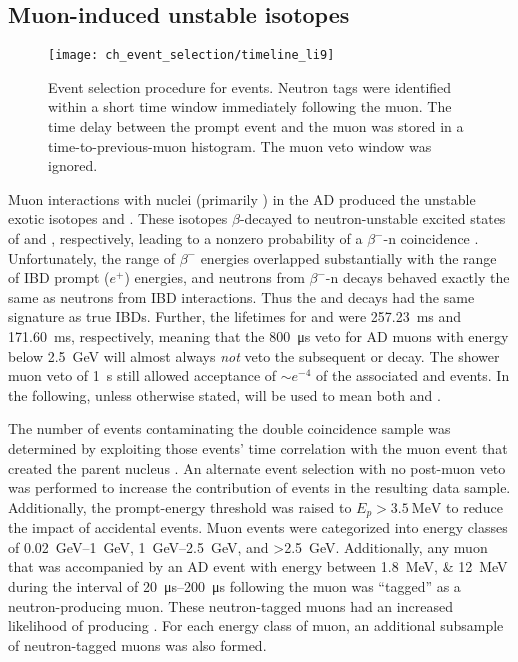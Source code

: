 \subsection{Muon-induced unstable isotopes}
\label{subsec:li9}

\begin{figure}
    \centering
    \texttt{[image: ch\_event\_selection/timeline\_li9]}
    \caption[\li{}/\he{} event selection]{
        Event selection procedure for \li{} events.
        Neutron tags were identified within a short time window
        immediately following the muon.
        The time delay between the prompt event and the muon
        was stored in a time-to-previous-muon histogram.
        The muon veto window was ignored.
    }
    \label{fig:li9_timeline}
\end{figure}

Muon interactions with nuclei (primarily ) in the AD
produced the unstable exotic isotopes \li{} and \he{}.
These isotopes $\beta$-decayed to neutron-unstable excited states
of  and , respectively,
leading to a nonzero probability of a $\beta^{-}$-n coincidence \cite{kamland_li9}.
Unfortunately, the range of $\beta^-$ energies overlapped substantially
with the range of IBD prompt ($e^+$) energies,
and neutrons from $\beta^-$-n decays behaved
exactly the same as neutrons from IBD interactions.
Thus the \li{} and \he{} decays had the same signature as true IBDs.
Further, the lifetimes for \li{} and \he{} were
\SI{257.23}{\ms} and \SI{171.60}{\ms}, respectively,
meaning that the \SI{800}{\us} veto for AD muons
with energy below \SI{2.5}{\GeV} will almost always
\emph{not} veto the subsequent \li{} or \he{} decay.
The shower muon veto of \SI{1}{\s} still allowed acceptance of
${\sim}e^{-4}$ of the associated \li{} and \he{} events.
In the following, unless otherwise stated,
\li{} will be used to mean both \li{} and \he{}.

The number of \li{} events contaminating the double coincidence sample
was determined by exploiting those events' time correlation
with the muon event that created the parent \li{} nucleus \cite{jinjing_2020may}.
An alternate event selection with no post-muon veto
was performed to increase the contribution of \li{} events
in the resulting data sample.
Additionally, the prompt-energy threshold
was raised to $E_p > \SI{3.5}{\MeV}$
to reduce the impact of accidental events.
Muon events were categorized into energy classes
of \SIrange{0.02}{1}{\GeV}, \SIrange{1}{2.5}{\GeV},
and \SI{>2.5}{\GeV}.
Additionally, any muon that was accompanied by
an AD event with energy between \SIlist{1.8;12}{\MeV}
during the interval of \SIrange{20}{200}{\us} following the muon
was ``tagged'' as a neutron-producing muon.
These neutron-tagged muons had an increased likelihood
of producing \li{}.
For each energy class of muon,
an additional subsample of neutron-tagged muons was also formed.

